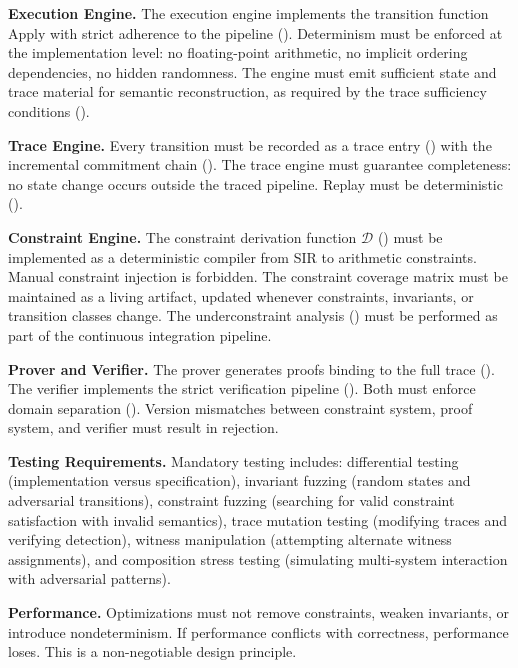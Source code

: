 \documentclass[11pt,a4paper]{article}
\theoremstyle{definition}
\newcommand{\Apply}{\mathrm{Apply}}
\begin{document}
\noindent\textbf{Execution Engine.} The execution engine implements the transition function $\Apply$ with strict adherence to the pipeline (). Determinism must be enforced at the implementation level: no floating-point arithmetic, no implicit ordering dependencies, no hidden randomness. The engine must emit sufficient state and trace material for semantic reconstruction, as required by the trace sufficiency conditions ().

\noindent\textbf{Trace Engine.} Every transition must be recorded as a trace entry () with the incremental commitment chain (). The trace engine must guarantee completeness: no state change occurs outside the traced pipeline. Replay must be deterministic ().

\noindent\textbf{Constraint Engine.} The constraint derivation function $\mathcal{D}$ () must be implemented as a deterministic compiler from SIR to arithmetic constraints. Manual constraint injection is forbidden. The constraint coverage matrix must be maintained as a living artifact, updated whenever constraints, invariants, or transition classes change. The underconstraint analysis () must be performed as part of the continuous integration pipeline.

\noindent\textbf{Prover and Verifier.} The prover generates proofs binding to the full trace (). The verifier implements the strict verification pipeline (). Both must enforce domain separation (). Version mismatches between constraint system, proof system, and verifier must result in rejection.

\noindent\textbf{Testing Requirements.} Mandatory testing includes: differential testing (implementation versus specification), invariant fuzzing (random states and adversarial transitions), constraint fuzzing (searching for valid constraint satisfaction with invalid semantics), trace mutation testing (modifying traces and verifying detection), witness manipulation (attempting alternate witness assignments), and composition stress testing (simulating multi-system interaction with adversarial patterns).

\noindent\textbf{Performance.} Optimizations must not remove constraints, weaken invariants, or introduce nondeterminism. If performance conflicts with correctness, performance loses. This is a non-negotiable design principle.
\end{document}
